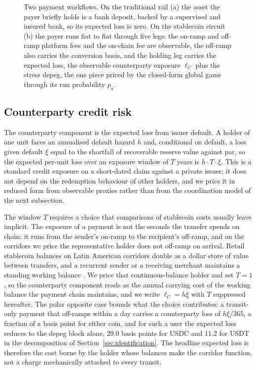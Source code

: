\begin{figure}[t]
\caption{Two payment workflows. On the traditional rail (a) the asset the payer briefly holds is a bank deposit, backed by a supervised and insured bank, so its expected loss is zero. On the stablecoin circuit (b) the payer runs fiat to fiat through five legs: the on-ramp and off-ramp platform fees and the on-chain fee are observable, the off-ramp also carries the conversion basis, and the holding leg carries the expected loss, the observable counterparty exposure $\ell_C$ plus the stress depeg, the one piece priced by the closed-form global game through its run probability $p_s$.}\label{fig:workflows}
\end{figure}

\subsection{Counterparty credit risk}\label{sub:counterparty}

The counterparty component is the expected loss from issuer default. A holder of one unit faces an annualised default hazard $h$ and, conditional on default, a loss given default $\xi$ equal to the shortfall of recoverable reserve value against par, so the expected per-unit loss over an exposure window of $T$ years is $h \cdot T \cdot \xi$. This is a standard credit exposure on a short-dated claim against a private issuer; it does not depend on the redemption behaviour of other holders, and we price it in reduced form from observable proxies rather than from the coordination model of the next subsection.

The window $T$ requires a choice that comparisons of stablecoin costs usually leave implicit. The exposure of a payment is not the seconds the transfer spends on chain: it runs from the sender's on-ramp to the recipient's off-ramp, and on the corridors we price the representative holder does not off-ramp on arrival. Retail stablecoin balances on Latin American corridors double as a dollar store of value between transfers, and a recurrent sender or a receiving merchant maintains a standing working balance \citep{chainalysis_2025, aldasoro_frost_ito_2026}. We price that continuous-balance holder and set $T = 1$, so the counterparty component reads as the annual carrying cost of the working balance the payment chain maintains, and we write $\ell_C = h \xi$ with $T$ suppressed hereafter. The polar opposite case bounds what the choice contributes: a transit-only payment that off-ramps within a day carries a counterparty loss of $h\xi/365$, a fraction of a basis point for either coin, and for such a user the expected loss reduces to the depeg block alone, 29.0 basis points for USDC and 11.2 for USDT in the decomposition of Section~\ref{sec:identification}. The headline expected loss is therefore the cost borne by the holder whose balances make the corridor function, not a charge mechanically attached to every transit.

